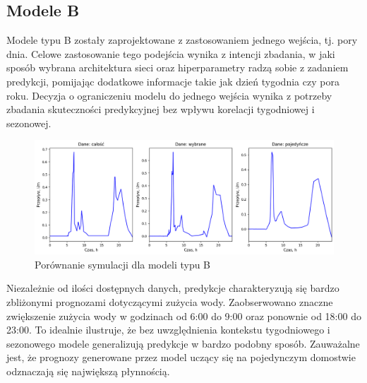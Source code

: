 \documentclass[a4paper,twoside,12pt]{book}
\begin{document}
\subsection*{Modele B}
Modele typu B zostały zaprojektowane z zastosowaniem jednego wejścia, tj. pory dnia. Celowe zastosowanie tego podejścia wynika z intencji zbadania, w jaki sposób wybrana architektura sieci oraz hiperparametry radzą sobie z zadaniem predykcji, pomijając dodatkowe informacje takie jak dzień tygodnia czy pora roku. Decyzja o ograniczeniu modelu do jednego wejścia wynika z potrzeby zbadania skuteczności predykcyjnej bez wpływu korelacji tygodniowej i sezonowej.
\begin{figure}[!h]
  \centering
  \includegraphics[width=1\textwidth]{img/Model_B.png}
  \caption{Porównanie symulacji dla modeli typu B}
  \label{fig:etykieta-rysunku}
\end{figure}

Niezależnie od ilości dostępnych danych, predykcje charakteryzują się bardzo zbliżonymi prognozami dotyczącymi zużycia wody. Zaobserwowano znaczne zwiększenie zużycia wody w godzinach od 6:00 do 9:00 oraz ponownie od 18:00 do 23:00. To idealnie ilustruje, że bez uwzględnienia kontekstu tygodniowego i sezonowego modele generalizują predykcje w bardzo podobny sposób. Zauważalne jest, że prognozy generowane przez model uczący się na pojedynczym domostwie odznaczają się największą płynnością.
\end{document}
